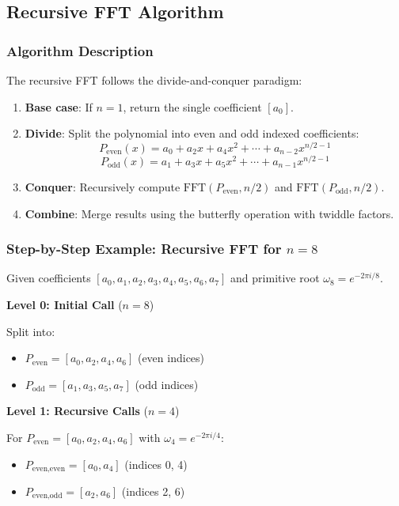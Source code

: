 \documentclass[a4paper]{article}
\theoremstyle{definition}
\begin{document}
\subsection{Recursive FFT Algorithm}

\subsubsection{Algorithm Description}

The recursive FFT follows the divide-and-conquer paradigm:

\begin{enumerate}
    \item \textbf{Base case}: If \( n = 1 \), return the single coefficient \([a_0]\).
    \item \textbf{Divide}: Split the polynomial into even and odd indexed coefficients:
    \[
    P_{\text{even}}(x) = a_0 + a_2x + a_4x^2 + \cdots + a_{n-2}x^{n/2-1}
    \]
    \[
    P_{\text{odd}}(x) = a_1 + a_3x + a_5x^2 + \cdots + a_{n-1}x^{n/2-1}
    \]
    \item \textbf{Conquer}: Recursively compute \(\text{FFT}(P_{\text{even}}, n/2)\) and \(\text{FFT}(P_{\text{odd}}, n/2)\).
    \item \textbf{Combine}: Merge results using the butterfly operation with twiddle factors.
\end{enumerate}

\subsubsection{Step-by-Step Example: Recursive FFT for \( n=8 \)}

Given coefficients \([a_0, a_1, a_2, a_3, a_4, a_5, a_6, a_7]\) and primitive root \(\omega_8 = e^{-2\pi i / 8}\).

\textbf{Level 0: Initial Call} (\( n=8 \))

Split into:
\begin{itemize}
    \item \( P_{\text{even}} = [a_0, a_2, a_4, a_6] \) (even indices)
    \item \( P_{\text{odd}} = [a_1, a_3, a_5, a_7] \) (odd indices)
\end{itemize}

\textbf{Level 1: Recursive Calls} (\( n=4 \))

For \( P_{\text{even}} = [a_0, a_2, a_4, a_6] \) with \(\omega_4 = e^{-2\pi i / 4}\):
\begin{itemize}
    \item \( P_{\text{even,even}} = [a_0, a_4] \) (indices 0, 4)
    \item \( P_{\text{even,odd}} = [a_2, a_6] \) (indices 2, 6)
\end{itemize}
\end{document}
